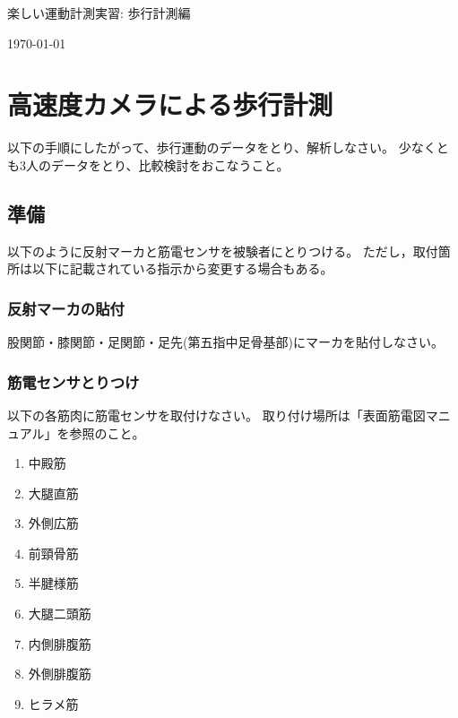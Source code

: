 \documentclass{jarticle}
\begin{document}
\begin{center}
  {\LARGE 楽しい運動計測実習: 歩行計測編}
\end{center}
\begin{flushright}
  \today
  \end{flushright}

\section{高速度カメラによる歩行計測}

以下の手順にしたがって、歩行運動のデータをとり、解析しなさい。
少なくとも3人のデータをとり、比較検討をおこなうこと。


\subsection{準備}

以下のように反射マーカと筋電センサを被験者にとりつける。
ただし，取付箇所は以下に記載されている指示から変更する場合もある。

\subsubsection{反射マーカの貼付}
股関節・膝関節・足関節・足先(第五指中足骨基部)にマーカを貼付しなさい。


\subsubsection{筋電センサとりつけ}
以下の各筋肉に筋電センサを取付けなさい。
取り付け場所は「表面筋電図マニュアル」を参照のこと。
\begin{enumerate}
\item 中殿筋
\item 大腿直筋
\item 外側広筋
\item 前頸骨筋
\item 半腱様筋
\item 大腿二頭筋
\item 内側腓腹筋
\item 外側腓腹筋
\item ヒラメ筋
\end{enumerate}
\end{document}

